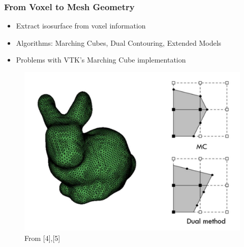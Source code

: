 \begin{frame}

	\frametitle{From Voxel to Mesh Geometry}
	
	\begin{itemize}
	\item Extract isosurface from voxel information
	\item Algorithms: Marching Cubes, Dual Contouring, Extended Models
	\item Problems with VTK's Marching Cube implementation
	\end{itemize}
	\begin{figure}
	\includegraphics[scale=0.35]{Pictures/bunny_MC.pdf}
	\caption{From [4],[5]}
	\end{figure}
	
\end{frame}


